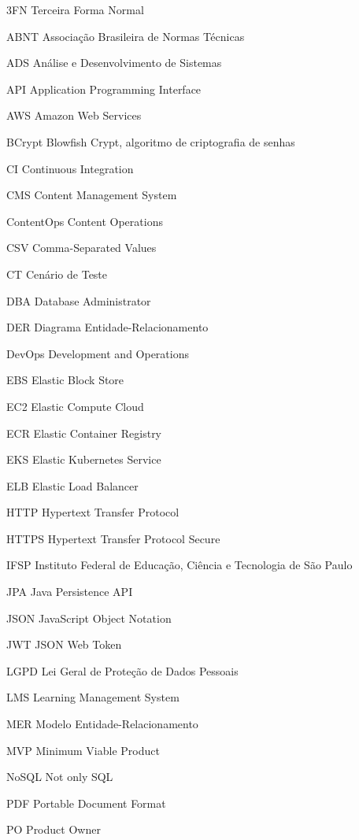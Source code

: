 \begin{siglas}
  \item[3FN] Terceira Forma Normal
  \item[ABNT] Associação Brasileira de Normas Técnicas
  \item[ADS] Análise e Desenvolvimento de Sistemas
  \item[API] Application Programming Interface
  \item[AWS] Amazon Web Services
  \item[BCrypt] Blowfish Crypt, algoritmo de criptografia de senhas
  \item[CI] Continuous Integration
  \item[CMS] Content Management System
  \item[ContentOps] Content Operations
  \item[CSV] Comma-Separated Values
  \item[CT] Cenário de Teste
  \item[DBA] Database Administrator
  \item[DER] Diagrama Entidade-Relacionamento
  \item[DevOps] Development and Operations
  \item[EBS] Elastic Block Store
  \item[EC2] Elastic Compute Cloud
  \item[ECR] Elastic Container Registry
  \item[EKS] Elastic Kubernetes Service
  \item[ELB] Elastic Load Balancer
  \item[HTTP] Hypertext Transfer Protocol
  \item[HTTPS] Hypertext Transfer Protocol Secure
  \item[IFSP] Instituto Federal de Educação, Ciência e Tecnologia de São Paulo
  \item[JPA] Java Persistence API
  \item[JSON] JavaScript Object Notation
  \item[JWT] JSON Web Token
  \item[LGPD] Lei Geral de Proteção de Dados Pessoais
  \item[LMS] Learning Management System
  \item[MER] Modelo Entidade-Relacionamento
  \item[MVP] Minimum Viable Product
  \item[NoSQL] Not only SQL
  \item[PDF] Portable Document Format
  \item[PO] Product Owner

\end{siglas}
